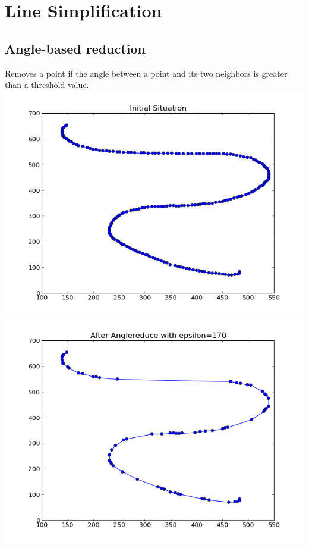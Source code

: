 \documentclass[twoside]{scrartcl}
\begin{document}
\section{Line Simplification}
\subsection{Angle-based reduction}
Removes a point if the angle between a point and its two neighbors
is greater than a threshold value.\\
\includegraphics[scale=0.48]{simp-1.png}
\includegraphics[scale=0.48]{simp-2.png}
\end{document}
